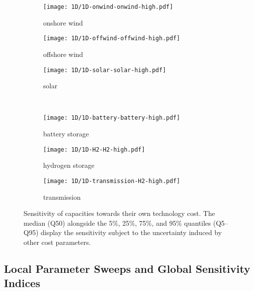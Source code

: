 \begin{figure}
    \begin{subfigure}[t]{0.32\textwidth}
        \caption{onshore wind}
        \texttt{[image: 1D/1D-onwind-onwind-high.pdf]}
    \end{subfigure}
    \begin{subfigure}[t]{0.32\textwidth}
        \caption{offshore wind}
        \texttt{[image: 1D/1D-offwind-offwind-high.pdf]}
    \end{subfigure}
    \begin{subfigure}[t]{0.32\textwidth}
        \caption{solar}
        \texttt{[image: 1D/1D-solar-solar-high.pdf]}
    \end{subfigure} \\
    \begin{subfigure}[t]{0.32\textwidth}
        \caption{battery storage}
        \texttt{[image: 1D/1D-battery-battery-high.pdf]}
    \end{subfigure}
    \begin{subfigure}[t]{0.32\textwidth}
        \caption{hydrogen storage}
        \texttt{[image: 1D/1D-H2-H2-high.pdf]}
    \end{subfigure}
    \begin{subfigure}[t]{0.32\textwidth}
        \caption{transmission}
        \texttt{[image: 1D/1D-transmission-H2-high.pdf]}
    \end{subfigure}
    \caption{
      Sensitivity of capacities towards their own technology cost.
      The median (Q50) alongside the 5\%, 25\%, 75\%, and 95\% quantiles (Q5--Q95) display
      the sensitivity subject to the uncertainty induced by other cost parameters.
    }
    \label{fig:sensitivity}
\end{figure}

\subsection{Local Parameter Sweeps and Global Sensitivity Indices}

